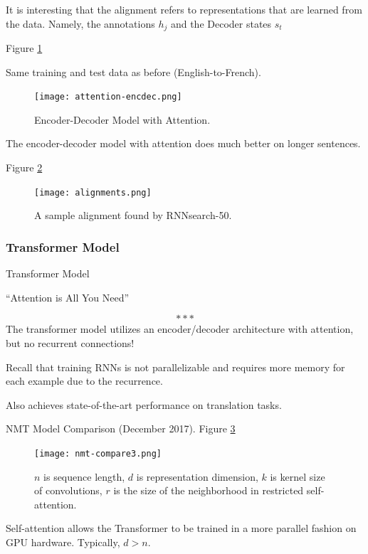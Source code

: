 \documentclass[english]{article}
\begin{document}
It is interesting that the alignment refers to representations that are learned from the data. Namely, the annotations $h_j$ and the Decoder states $s_t$

\item   Figure \ref{Encoder-Decoder Model with Attention}

Same training and test data as before (English-to-French).

\begin{figure}
\centering
\texttt{[image: attention-encdec.png]}
    \caption{Encoder-Decoder Model with Attention.}
    \label{Encoder-Decoder Model with Attention}
\end{figure}

The encoder-decoder model with attention does much better on longer sentences.
 

\item  Figure \ref{A sample alignment found by RNNsearch-50}


\begin{figure}
\centering
\texttt{[image: alignments.png]}
\caption{A sample alignment found by RNNsearch-50.}
    \label{A sample alignment found by RNNsearch-50}
\end{figure}
 \eenum

\subsubsection{Transformer Model}
\benum
\item 
 {Transformer Model}

\begin{center}``Attention is All You Need''\end{center}
$$***$$
The transformer model utilizes an encoder/decoder architecture with attention, but no recurrent connections!
 
Recall that training RNNs is not parallelizable and requires more memory for each example due to the recurrence.
 
Also achieves state-of-the-art performance on translation tasks.
 



\item 
 {NMT Model Comparison (December 2017)}.  Figure \ref{NMT Model Comparison}

\begin{figure}
\centering
\texttt{[image: nmt-compare3.png]}
\caption{$n$ is sequence length, $d$ is representation dimension, $k$ is kernel size of convolutions, $r$ is the size of the neighborhood in restricted self-attention.}
    \label{NMT Model Comparison}
\end{figure}
Self-attention allows the Transformer to be trained in a more parallel fashion on GPU hardware. Typically, $d> n$.
 
\end{document}
